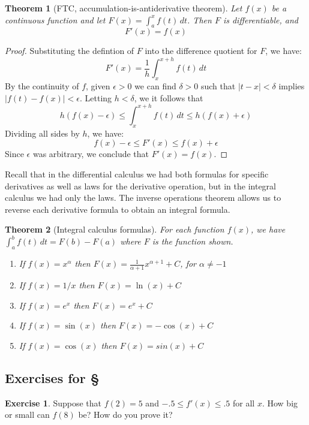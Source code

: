 \documentclass[11pt,oneside]{amsbook}
\theoremstyle{definition}
\newtheorem{exerc}{Exercise}[section]
\theoremstyle{plain}
\newtheorem{thm}{Theorem}[section]
\theoremstyle{definition}
\theoremstyle{remark}
\numberwithin{equation}{section}
\numberwithin{figure}{section}
\begin{document}
\begin{thm}[FTC, accumulation-is-antiderivative theorem]
  Let $f(x)$ be a continuous function and let $F(x)=\int_a^x f(t)\,dt$. Then $F$ is differentiable, and
  \[F'(x)=f(x)
  \]
\end{thm}

\begin{proof}
  Substituting the defintion of $F$ into the difference quotient for $F$, we have:
  \[F'(x)=\frac{1}{h}\int_x^{x+h} f(t)\,dt
  \]
  By the continuity of $f$, given $\epsilon>0$ we can find $\delta>0$ such that $|t-x|<\delta$ implies $|f(t)-f(x)|<\epsilon$. Letting $h<\delta$, we it follows that
  \[h(f(x)-\epsilon)\leq\int_x^{x+h} f(t)\,dt\leq h(f(x)+\epsilon)
  \]
  Dividing all sides by $h$, we have:
  \[f(x)-\epsilon\leq F'(x)\leq f(x)+\epsilon
  \]
  Since $\epsilon$ was arbitrary, we conclude that $F'(x)=f(x)$.
\end{proof}

Recall that in the differential calculus we had both formulas for specific derivatives as well as laws for the derivative operation, but in the integral calculus we had only the laws. The inverse operations theorem allows us to reverse each derivative formula to obtain an integral formula.

\begin{thm}[Integral calculus formulas]
  For each function $f(x)$, we have $\int_a^bf(t)\,dt=F(b)-F(a)$ where $F$ is the function shown.
  \begin{enumerate}
    \item If $f(x)=x^\alpha$ then $F(x)=\frac{1}{\alpha+1}x^{\alpha+1}+C$, for $\alpha\neq-1$
    \item If $f(x)=1/x$ then $F(x)=\ln(x)+C$
    \item If $f(x)=e^x$ then $F(x)=e^x+C$
    \item If $f(x)=\sin(x)$ then $F(x)=-\cos(x)+C$
    \item If $f(x)=\cos(x)$ then $F(x)=sin(x)+C$
  \end{enumerate}
\end{thm}

\newpage
\subsection*{Exercises for \S \thesection}

\begin{exerc}
  Suppose that $f(2)=5$ and $-.5\leq f'(x)\leq.5$ for all $x$. How big or small can $f(8)$ be? How do you prove it?
\end{exerc}
\end{document}
